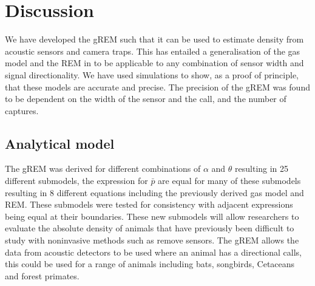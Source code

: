 \documentclass[a4paper,10pt,reqno,oneside]{amsart}
\begin{document}
\section{Discussion}

We have developed the gREM such that it can be used to estimate density from acoustic sensors and camera traps. This has entailed a generalisation of the gas model and the REM in \citep{rowcliffe2008estimating} to be applicable to any combination of sensor width and signal directionality. We have used simulations to show, as a proof of principle, that these models are accurate and precise. The precision of the gREM was found to be dependent on the width of the sensor and the call, and the number of captures.

\subsection{Analytical model}
The gREM was derived for different combinations of $\alpha$ and $\theta$ resulting in 25 different submodels, the expression for $\bar{p}$ are equal for many of these submodels resulting in 8 different equations including the previously derived gas model and REM. These submodels were tested for consistency with adjacent expressions being equal at their boundaries. These new submodels will allow researchers to evaluate the absolute density of animals that have previously been difficult to study with noninvasive methods such as remove sensors. The gREM allows the data from acoustic detectors to be used where an animal has a directional calls, this could be used for a range of animals including bats, songbirds, Cetaceans and forest primates. 
\end{document}
